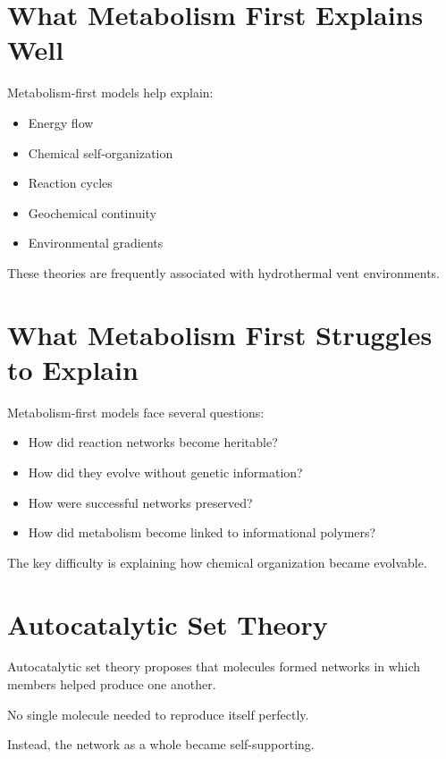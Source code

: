 \documentclass[
  oneside,
  openany]{book}
\providecommand{\tightlist}{%
  \setlength{\itemsep}{0pt}\setlength{\parskip}{0pt}}
\begin{document}
\section{What Metabolism First Explains Well}\label{what-metabolism-first-explains-well}

Metabolism-first models help explain:

\begin{itemize}
\tightlist
\item
  Energy flow
\item
  Chemical self-organization
\item
  Reaction cycles
\item
  Geochemical continuity
\item
  Environmental gradients
\end{itemize}

These theories are frequently associated with hydrothermal vent environments.

\section{What Metabolism First Struggles to Explain}\label{what-metabolism-first-struggles-to-explain}

Metabolism-first models face several questions:

\begin{itemize}
\tightlist
\item
  How did reaction networks become heritable?
\item
  How did they evolve without genetic information?
\item
  How were successful networks preserved?
\item
  How did metabolism become linked to informational polymers?
\end{itemize}

The key difficulty is explaining how chemical organization became evolvable.

\section{Autocatalytic Set Theory}\label{autocatalytic-set-theory}

Autocatalytic set theory proposes that molecules formed networks in which members helped produce one another.

No single molecule needed to reproduce itself perfectly.

Instead, the network as a whole became self-supporting.
\end{document}
